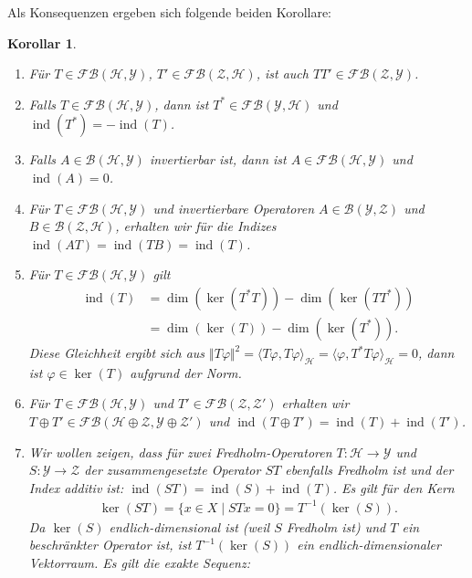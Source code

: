 \documentclass[11pt, hidelinks]{article}
\newcommand{\h}{\mathcal{H}}
\newcommand{\ind}{\operatorname{ind}}
\numberwithin{conj}{section}
\newtheorem{corollary}[conj]{Korollar}
\begin{document}
Als Konsequenzen ergeben sich folgende beiden Korollare:

\begin{corollary}\noindent
    \begin{enumerate}
        \item Für $T \in \mathcal{FB}(\h,\mathcal{Y})$, $T' \in \mathcal{FB}(\mathcal{Z},\h)$, ist auch $TT'\in \mathcal{FB}(\mathcal{Z},\mathcal{Y})$.
        \item Falls $T \in \mathcal{FB}(\h,\mathcal{Y})$, dann ist $T^\ast \in \mathcal{FB}(\mathcal{Y},\h)$ und $\ind(T^\ast) = - \ind(T)$.
        \item Falls $A \in \mathcal{B}(\h,\mathcal{Y})$ invertierbar ist, dann ist $A \in \mathcal{FB}(\h,\mathcal{Y})$ und $\ind(A) = 0$.
        \item Für $T \in \mathcal{FB}(\h,\mathcal{Y})$ und invertierbare Operatoren $A \in \mathcal{B}(\mathcal{Y},\mathcal{Z})$ und $B \in \mathcal{B}(\mathcal{Z},\h)$, erhalten wir für die Indizes $\ind(AT) = \ind(TB) = \ind(T)$.
        \item Für $T \in \mathcal{FB}(\h,\mathcal{Y})$ gilt
        \begin{align}
            \ind(T) &= \dim(\ker(T^\ast T)) - \dim(\ker(TT^\ast)) \\
                    &= \dim(\ker(T)) - \dim(\ker(T^\ast)).
        \end{align}
        Diese Gleichheit ergibt sich aus $\Vert T\varphi \Vert^2 = \langle T\varphi, T\varphi \rangle_\h = \langle \varphi, T^\ast T\varphi \rangle_\h = 0$, dann ist $\varphi \in \ker(T)$ aufgrund der Norm.
        \item Für $T \in \mathcal{FB}(\h,\mathcal{Y})$ und $T' \in \mathcal{FB}(\mathcal{Z},\mathcal{Z}')$ erhalten wir $T \oplus T' \in \mathcal{FB}(\h \oplus \mathcal{Z}, \mathcal{Y} \oplus \mathcal{Z}')$ und $\ind(T \oplus T') = \ind(T) + \ind(T')$.
        \item Wir wollen zeigen, dass für zwei Fredholm-Operatoren \( T: \h \to \mathcal{Y} \) und \( S: \mathcal{Y} \to \mathcal{Z} \) der zusammengesetzte Operator \( S T \) ebenfalls Fredholm ist und der Index additiv ist: $\operatorname{ind}(S T) = \operatorname{ind}(S) + \operatorname{ind}(T)$. Es gilt für den Kern
   \begin{align}
     \ker(S T) = \{ x \in X \mid S T x = 0 \} = T^{-1}(\ker(S)).
   \end{align}
     Da \( \ker(S)\) endlich-dimensional ist (weil \( S \) Fredholm ist) und \( T \) ein beschränkter Operator ist, ist \( T^{-1}(\ker(S)) \) ein endlich-dimensionaler Vektorraum. Es gilt die exakte Sequenz:

\end{enumerate}
\end{corollary}
\end{document}
